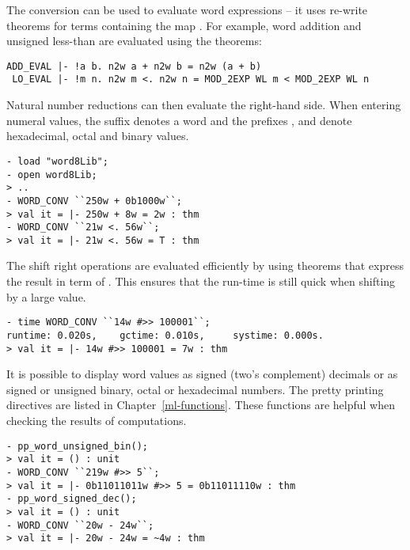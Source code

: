 The conversion  can be used to evaluate word expressions -- it uses re-write theorems for terms containing the map .  For example, word addition and unsigned less-than are evaluated using the theorems:

\begin{hol}\begin{verbatim}
ADD_EVAL |- !a b. n2w a + n2w b = n2w (a + b)
 LO_EVAL |- !m n. n2w m <. n2w n = MOD_2EXP WL m < MOD_2EXP WL n
\end{verbatim}\end{hol}

\noindent Natural number reductions can then evaluate the right-hand side.  When entering numeral values, the suffix  denotes a word and the prefixes ,  and  denote hexadecimal, octal and binary values.

\setcounter{sessioncount}{0}
\begin{session}\begin{verbatim}
- load "word8Lib";
- open word8Lib;
> ..
- WORD_CONV ``250w + 0b1000w``;
> val it = |- 250w + 8w = 2w : thm
- WORD_CONV ``21w <. 56w``;
> val it = |- 21w <. 56w = T : thm
\end{verbatim}\end{session}

The shift right operations are evaluated efficiently by using theorems that express the result in term of .  This ensures that the run-time is still quick when shifting by a large value.

\begin{session}\begin{verbatim}
- time WORD_CONV ``14w #>> 100001``;
runtime: 0.020s,    gctime: 0.010s,     systime: 0.000s.
> val it = |- 14w #>> 100001 = 7w : thm
\end{verbatim}\end{session}

It is possible to display word values as signed (two's complement) decimals or as signed or unsigned binary, octal or hexadecimal numbers.  The pretty printing directives are listed in Chapter~\ref{ml-functions}.  These functions are helpful when checking the results of computations.
\begin{session}\begin{verbatim}
- pp_word_unsigned_bin();
> val it = () : unit
- WORD_CONV ``219w #>> 5``;
> val it = |- 0b11011011w #>> 5 = 0b11011110w : thm
- pp_word_signed_dec();
> val it = () : unit
- WORD_CONV ``20w - 24w``;
> val it = |- 20w - 24w = ~4w : thm
\end{verbatim}\end{session}

